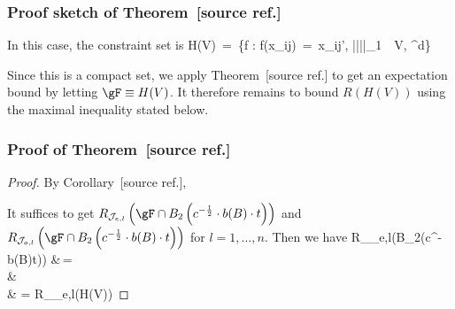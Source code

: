\documentclass[twoside,11pt]{article}
\makeatletter
\newcommand{\rev}[1]{{\color{revisionred}#1}}
\newcommand{\discardlabel}[1]{}
\newcommand{\discardtwo}[2]{}
\newcommand{\legacyref}[1]{\textup{[source ref.]}}
\newcommand{\legacyeqref}[1]{\textup{[source equation]}}
\newenvironment{legacycomparison}{%
  \begingroup\color{legacygray}%
  \let\label\discardlabel
  \let\originallabel\discardlabel
  \let\ref\legacyref
  \let\pageref\legacyref
  \let\eqref\legacyeqref
  \let\cref\legacyref
  \let\Cref\legacyref
  \let\autoref\legacyref
  \let\aliasref\discardtwo
}{\endgroup}
\newcommand{\aliasref}[2]{%
  \@ifundefined{r@#2}{}{%
    \expandafter\let\csname r@#1\expandafter\endcsname\csname r@#2\endcsname}}
\makeatother
\begin{document}
\begin{legacycomparison}
% 

\subsubsection{Proof sketch of Theorem~\ref{thm_hd}}
In this case, the constraint set is
\bea
H(V) \,=\, \{f : f(x_{ij}) \,=\, x_{ij}'\beta, ||\beta||_1 \,\leq\, V, \beta \in {}^d\} 
\bea

Since this is a compact set, \rev{we apply} Theorem~\ref{Theorem_1} to get an expectation bound by letting $\gF \equiv H(V)$. \rev{It therefore remains to bound} $ R(H(V)) $ \rev{using the maximal inequality stated below}.

\subsubsection{Proof of Theorem~\ref{thm_hd}}
\begin{proof}
By Corollary~\ref{cor_op}, 




It suffices to get  $R_{\mathcal{J}_{e,l}}\left(\gF\cap B_2\left(c^{-\frac{1}{2}}\cdot b(B)\cdot t\right)\right)$ and  $ R_{\mathcal{J}_{o,l}}\left(\gF\cap B_2\left(c^{-\frac{1}{2}}\cdot b(B)\cdot t\right)\right)$ for $l = 1, \dots, n$.   
Then we have 
\bea 
R_{_{e,l}}\left(\gF\cap B_2\left(c^{-}\cdot b(B)\cdot t\right)\right) &\,=\, \\
& \leq {}\\
& = R_{_{e,l}}\left(H(V)\right)
\bea 
 

\end{proof}
\end{legacycomparison}
\end{document}
